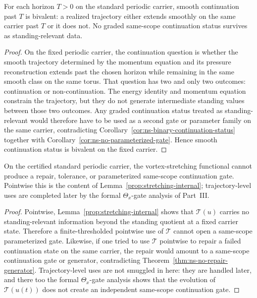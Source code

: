 \begin{manualproposition}
\label{prop:13-5B-energy-momentum-force-binary}
For each horizon $T>0$ on the standard periodic carrier, smooth continuation past $T$ is bivalent:
a realized trajectory either extends smoothly on the same carrier past $T$ or it does not.
No graded same-scope continuation status survives as standing-relevant data.
\end{manualproposition}

\begin{proof}
On the fixed periodic carrier, the continuation question is whether the smooth trajectory determined
by the momentum equation and its pressure reconstruction extends past the chosen horizon while
remaining in the same smooth class on the same torus.  That question has two and only two outcomes:
continuation or non-continuation.  The energy identity and momentum equation constrain the
trajectory, but they do not generate intermediate standing values between those two outcomes.
Any graded continuation status treated as standing-relevant would therefore have to be used as a
second gate or parameter family on the same carrier, contradicting
Corollary~\ref{cor:ns-binary-continuation-status} together with
Corollary~\ref{cor:ns-no-parameterized-gate}.  Hence smooth continuation status is bivalent on the
fixed carrier.
\end{proof}

\begin{manualproposition}
\label{prop:13-5C-vortex-stretching-no-repair-no-parameterized-gates}
On the certified standard periodic carrier, the vortex-stretching functional cannot produce a repair,
tolerance, or parameterized same-scope continuation gate.  Pointwise this is the content of
Lemma~\ref{prop:stretching-internal}; trajectory-level uses are completed later by the formal
$\Theta_x$-gate analysis of Part~III.
\end{manualproposition}

\begin{proof}
Pointwise, Lemma~\ref{prop:stretching-internal} shows that $\mathcal T(u)$ carries no
standing-relevant information beyond the standing quotient at a fixed carrier state.  Therefore a
finite-thresholded pointwise use of $\mathcal T$ cannot open a same-scope parameterized gate.
Likewise, if one tried to use $\mathcal T$ pointwise to repair a failed continuation state on the same
carrier, the repair would amount to a same-scope continuation gate or generator, contradicting
Theorem~\ref{thm:ns-no-repair-generator}.  Trajectory-level uses are not smuggled in here: they are
handled later, and there too the formal $\Theta_x$-gate analysis shows that the evolution of
$\mathcal T(u(t))$ does not create an independent same-scope continuation gate.
\end{proof}

